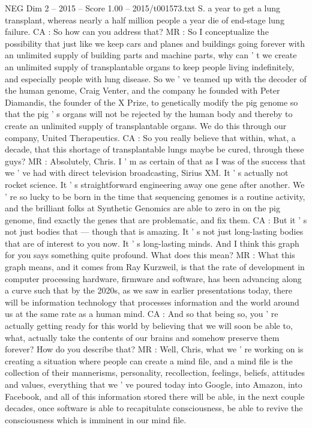 \begin{textsample}{NEG Dim 2 – 2015 – Score 1.00 – 2015/t001573.txt}
S. a year to get a lung transplant, whereas nearly a half million people a year die of end-stage lung failure.
CA : So how can you address that?
MR : So I conceptualize the possibility that just like we keep cars and planes and buildings going forever with an unlimited supply of building parts and machine parts, why can ' t we create an unlimited supply of transplantable organs to keep people living indefinitely, and especially people with lung disease.
So we ' ve teamed up with the decoder of the human genome, Craig Venter, and the company he founded with Peter Diamandis, the founder of the X Prize, to genetically modify the pig genome so that the pig ' s organs will not be rejected by the human body and thereby to create an unlimited supply of transplantable organs.
We do this through our company, United Therapeutics.
CA : So you really believe that within, what, a decade, that this shortage of transplantable lungs maybe be cured, through these guys?
MR : Absolutely, Chris.
I ' m as certain of that as I was of the success that we ' ve had with direct television broadcasting, Sirius XM.
It ' s actually not rocket science.
It ' s straightforward engineering away one gene after another.
We ' re so lucky to be born in the time that sequencing genomes is a routine activity, and the brilliant folks at Synthetic Genomics are able to zero in on the pig genome, find exactly the genes that are problematic, and fix them.
CA : But it ' s not just bodies that — though that is amazing.
It ' s not just long-lasting bodies that are of interest to you now.
It ' s long-lasting minds.
And I think this graph for you says something quite profound.
What does this mean?
MR : What this graph means, and it comes from Ray Kurzweil, is that the rate of development in computer processing hardware, firmware and software, has been advancing along a curve such that by the 2020s, as we saw in earlier presentations today, there will be information technology that processes information and the world around us at the same rate as a human mind.
CA : And so that being so, you ' re actually getting ready for this world by believing that we will soon be able to, what, actually take the contents of our brains and somehow preserve them forever?
How do you describe that?
MR : Well, Chris, what we ' re working on is creating a situation where people can create a mind file, and a mind file is the collection of their mannerisms, personality, recollection, feelings, beliefs, attitudes and values, everything that we ' ve poured today into Google, into Amazon, into Facebook, and all of this information stored there will be able, in the next couple decades, once software is able to recapitulate consciousness, be able to revive the consciousness which is imminent in our mind file.

\end{textsample}
